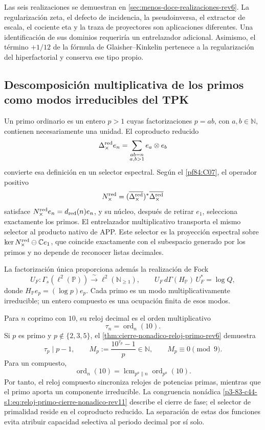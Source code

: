 Las seis realizaciones se demuestran en
\cref{sec:menos-doce-realizaciones-rev6}. La regularizaci\'on zeta, el defecto
de incidencia, la pseudoinversa, el extractor de escala, el cociente eta y la
traza de proyectores son aplicaciones diferentes. Una identificaci\'on de sus
dominios requerir\'ia un entrelazador adicional. Asimismo, el t\'ermino
\(+1/12\) de la f\'ormula de Glaisher--Kinkelin pertenece a la regularizaci\'on
del hiperfactorial y conserva ese tipo propio.

\subsection{Descomposición multiplicativa de los primos como modos irreducibles del TPK}

Un primo ordinario es un entero \(p>1\) cuyas factorizaciones
\(p=ab\), con \(a,b\in\mathbb N\), contienen necesariamente una unidad. El
coproducto reducido
\[
 \Delta_{\times}^{\rm red}e_n
 =\sum_{\substack{ab=n\\a,b>1}}e_a\otimes e_b
\]
convierte esa definici\'on en un selector espectral. Seg\'un el
\cref{pf84:C07}, el operador positivo
\[
 N_{\times}^{\rm red}
 =(\overline{\Delta_{\times}^{\rm red}})^*
   \overline{\Delta_{\times}^{\rm red}}
\]
satisface
\(N_{\times}^{\rm red}e_n=d_{\rm red}(n)e_n\), y su n\'ucleo, despu\'es de
retirar \(e_1\), selecciona exactamente los primos. El entrelazador
multiplicativo transporta el mismo selector al producto nativo de APP\@. Este
selector es la proyección espectral sobre
\(\ker N_{\times}^{\rm red}\ominus\mathbb C e_1\), que coincide exactamente
con el subespacio generado por los primos y no depende de reconocer listas
decimales.

La factorizaci\'on única proporciona adem\'as la realizaci\'on de Fock
\[
 U_F:\Gamma_s(\ell^2(\mathbb P))
 \xrightarrow{\ \sim\ }\ell^2(\mathbb N_{\geq1}),
 \qquad
 U_F\,d\Gamma(H_{\mathbb P})\,U_F^*=\log Q,
\]
donde \(H_{\mathbb P}e_p=(\log p)e_p\). Cada primo es un modo
multiplicativamente irreducible; un entero compuesto es una ocupaci\'on finita
de esos modos.

Para \(n\) coprimo con \(10\), su reloj decimal es el orden multiplicativo
\[
 \tau_n=\operatorname{ord}_n(10).
\]
Si \(p\) es primo y \(p\notin\{2,3,5\}\), el
\cref{thm:cierre-nonadico-reloj-primo-rev6} demuestra
\begin{equation}
 \tau_p\mid p-1,
 \qquad
 M_p:=\frac{10^{\tau_p}-1}{p}\in\mathbb N,
 \qquad
 M_p\equiv0\pmod9.
 \label{p3-83-c44-s1:eq:reloj-primo-cierre-nonadico-rev11}
\end{equation}
Para un compuesto,
\[
 \operatorname{ord}_{n}(10)
 =\operatorname{lcm}_{p^a\parallel n}\operatorname{ord}_{p^a}(10).
\]
Por tanto, el reloj compuesto sincroniza relojes de potencias primas, mientras
que el primo aporta un componente irreducible. La congruencia non\'adica
\eqref{p3-83-c44-s1:eq:reloj-primo-cierre-nonadico-rev11} describe el cierre de fase; el
selector de primalidad reside en el coproducto reducido. La separaci\'on de
estas dos funciones evita atribuir capacidad selectiva al periodo decimal por
s\'i solo.


